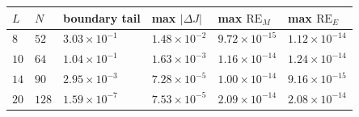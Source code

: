 \begin{tabular}{llllll}
\toprule
$L$ & $N$ & boundary tail & max $|\Delta J|$ & max $\mathrm{RE}_M$ & max $\mathrm{RE}_E$ \\
\midrule
\(8\) & \(52\) & \(3.03\times10^{-1}\) & \(1.48\times10^{-2}\) & \(9.72\times10^{-15}\) & \(1.12\times10^{-14}\) \\
\(10\) & \(64\) & \(1.04\times10^{-1}\) & \(1.63\times10^{-3}\) & \(1.16\times10^{-14}\) & \(1.24\times10^{-14}\) \\
\(14\) & \(90\) & \(2.95\times10^{-3}\) & \(7.28\times10^{-5}\) & \(1.00\times10^{-14}\) & \(9.16\times10^{-15}\) \\
\(20\) & \(128\) & \(1.59\times10^{-7}\) & \(7.53\times10^{-5}\) & \(2.09\times10^{-14}\) & \(2.08\times10^{-14}\) \\
\bottomrule
\end{tabular}
